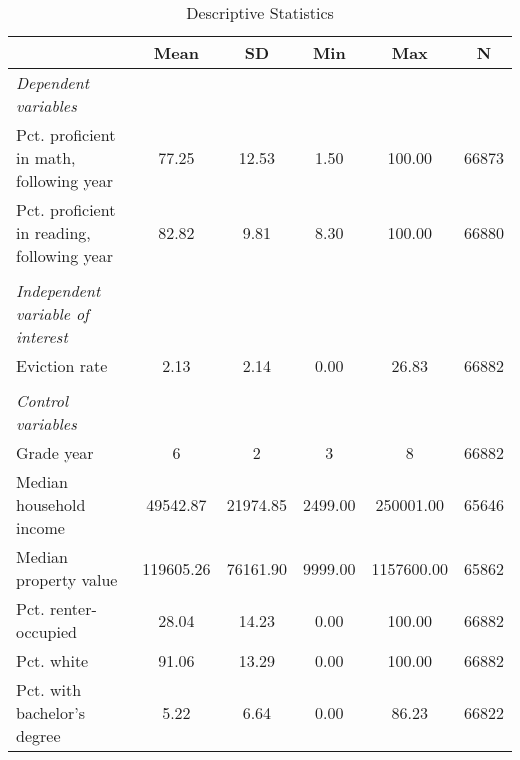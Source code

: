 \begin{table}[htbp]\centering
\def\sym#1{\ifmmode^{#1}\else\(^{#1}\)\fi}
\caption{Descriptive Statistics}
\begin{tabular}{l*{1}{ccccc}}
\toprule
                    &        Mean&          SD&         Min&         Max&           N\\
\midrule
\emph{Dependent variables}&            &            &            &            &            \\
\hspace{0.25cm} Pct. proficient in math, following year&       77.25&       12.53&        1.50&      100.00&       66873\\
\hspace{0.25cm} Pct. proficient in reading, following year&       82.82&        9.81&        8.30&      100.00&       66880\\
\vspace{0.1em} \\ \emph{Independent variable of interest}&            &            &            &            &            \\
\hspace{0.25cm} Eviction rate&        2.13&        2.14&        0.00&       26.83&       66882\\
\vspace{0.1em} \\ \emph{Control variables}&            &            &            &            &            \\
\hspace{0.25cm} Grade year&           6&           2&           3&           8&       66882\\
\hspace{0.25cm} Median household income&    49542.87&    21974.85&     2499.00&   250001.00&       65646\\
\hspace{0.25cm} Median property value&   119605.26&    76161.90&     9999.00&  1157600.00&       65862\\
\hspace{0.25cm} Pct. renter-occupied&       28.04&       14.23&        0.00&      100.00&       66882\\
\hspace{0.25cm} Pct. white&       91.06&       13.29&        0.00&      100.00&       66882\\
\hspace{0.25cm} Pct. with bachelor's degree&        5.22&        6.64&        0.00&       86.23&       66822\\

\end{tabular}
\end{table}
